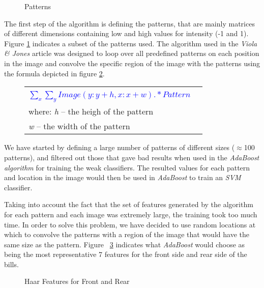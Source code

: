 \documentclass[11pt,twocolumn]{article}
\begin{document}
			\begin{figure}[!hbtp]
				\caption{Patterns}
				\label{patterns}
			\end{figure}

			The first step of the algorithm is defining the patterns, that are mainly matrices of different dimensions containing low and high values for intensity (-1 and 1). Figure \ref{patterns} indicates a subset of the patterns used. The algorithm used in the \emph{Viola \& Jones} article was designed to loop over all predefined patterns on each position in the image and convolve the specific region of the image with the patterns using the formula depicted in figure \ref{patterns_formula}.
			
			\begin{figure}
				\selectfont\small
				\caption{}
				\begin{tabular}{|lr|} \hline
					& \\[5pt]
					\textcolor{blue}{$\sum_x\sum_y Image(y:y+h,x:x+w) .* Pattern$} &\\[10pt]
					where: \emph{h} -- the heigh of the pattern &\\
					\hspace*{28px} \emph{w} -- the width of the pattern &\\[5pt] 
					\hline 
				\end{tabular}
				\label{patterns_formula}
			\end{figure}
			
			We have started by defining a large number of patterns of different sizes ($\approx$100 patterns), and filtered out those that gave bad results when used in the \emph{AdaBoost algorithm} for training the weak classifiers. The resulted values for each pattern and location in the image would then be used in \emph{AdaBoost} to train an \emph{SVM} classifier. 
			
			Taking into account the fact that the set of features generated	by the algorithm for each pattern and each image was extremely large, the training took too much time. In order to solve this problem, we have decided to use random locations at which to convolve the patterns with a region of the image that would have the same size as the pattern. Figure~ \ref{Haar_features} indicates what \emph{AdaBoost} would choose as being the most representative 7 features for the front side and rear side of the bills.

			\begin{figure}[!hbtp]
				\centering
				\caption{Haar Features for Front and Rear}
				\label{Haar_features}
			\end{figure}
\end{document}

